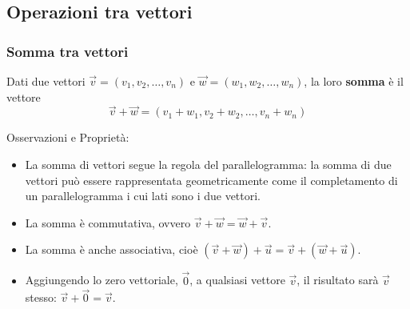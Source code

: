 \documentclass{book}
\begin{document}
\subsection{Operazioni tra vettori}
\subsubsection{Somma tra vettori}
\begin{theorem}
    Dati due vettori \(\vec{v}=(v_1, v_2, \ldots, v_n)\) e \(\vec{w}=(w_1, w_2, \ldots, w_n)\), la loro \textbf{somma} è il vettore
    \[
        \vec{v}+\vec{w}=(v_1+w_1, v_2+w_2, \ldots, v_n+w_n)
    \]

    \noindent Osservazioni e Proprietà:
    \begin{itemize}
        \item La somma di vettori segue la regola del parallelogramma: la somma di due vettori può essere rappresentata geometricamente come il completamento di un parallelogramma i cui lati sono i due vettori.
        \item La somma è commutativa, ovvero \(\vec{v} + \vec{w} = \vec{w} + \vec{v}\).
        \item La somma è anche associativa, cioè \((\vec{v} + \vec{w}) + \vec{u} = \vec{v} + (\vec{w} + \vec{u})\).
        \item Aggiungendo lo zero vettoriale, \(\vec{0}\), a qualsiasi vettore \(\vec{v}\), il risultato sarà \(\vec{v}\) stesso: \(\vec{v} + \vec{0} = \vec{v}\).
    \end{itemize}
\end{theorem}
\end{document}
